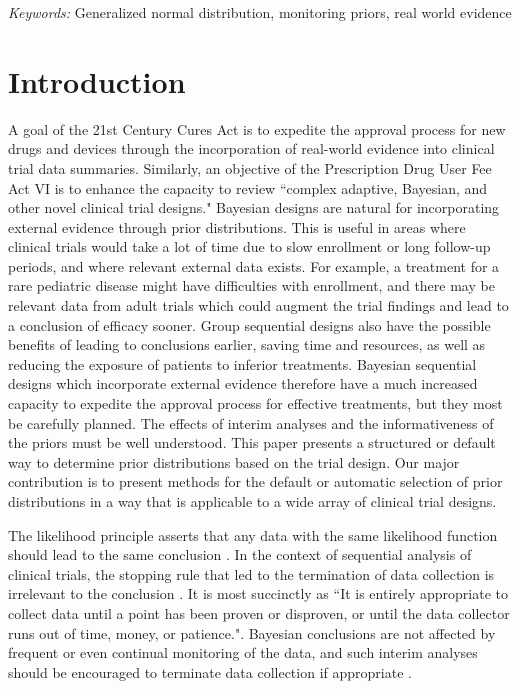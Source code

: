 \documentclass[12pt]{article}
\begin{document}
\noindent%
{\it Keywords:}  Generalized normal distribution, monitoring priors, real world evidence
\vfill

\newpage
{} %

\section{Introduction}

A goal of the 21st Century Cures Act \citep{USCongress2016} is to expedite the approval process for new drugs and devices through the incorporation of real-world evidence into clinical trial data summaries. Similarly, an objective of the Prescription Drug User Fee Act VI  is to enhance the capacity to review ``complex adaptive, Bayesian, and other novel clinical trial designs." \citep{FDA2017} Bayesian designs are natural for incorporating external evidence through prior distributions. This is useful in areas where clinical trials would take a lot of time due to slow enrollment or long follow-up periods, and where relevant external data exists. For example, a treatment for a rare pediatric disease might have difficulties with enrollment, and there may be relevant data from adult trials which could augment the trial findings and lead to a conclusion of efficacy sooner. Group sequential designs also have the possible benefits of leading to conclusions earlier, saving time and resources, as well as reducing the exposure of patients to inferior treatments. Bayesian sequential designs which incorporate external evidence therefore have a much increased capacity to expedite the approval process for effective treatments, but they most be carefully planned. The effects of interim analyses and the informativeness of the priors must be well understood. This paper presents a structured or default way to determine prior distributions based on the trial design. Our major contribution is to present methods for the default or automatic selection of prior distributions in a way that is applicable to a wide array of clinical trial designs.

The likelihood principle asserts that any data with the same likelihood function should lead to the same conclusion \citep{Berger1988}. In the context of sequential analysis of clinical trials, the stopping rule that led to the termination of data collection is irrelevant to the conclusion \citep{Barnard1947,Anscombe1963,Cornfield1966a,Cornfield1966b}. It is most succinctly as ``It is entirely appropriate to collect data until a point has been proven or disproven, or until the data collector runs out of time, money, or patience."\citep{Edwards1963}. Bayesian conclusions are not affected by frequent or even continual monitoring of the data, and such interim analyses should be encouraged to terminate data collection if appropriate \citep{Berry1989,Berry1993,Spiegelhalter1994}.
\end{document}
